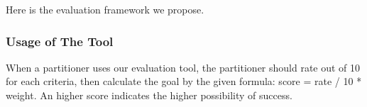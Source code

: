 Here is the evaluation framework we propose.

\begin{figure}[ht]
\centering
{}
\end{figure}

\subsubsection{Usage of The Tool}

When a partitioner uses our evaluation tool, the partitioner should rate out of 10 for each criteria, then calculate the goal by the given formula: score = rate / 10 * weight. An higher score indicates the higher possibility of success.